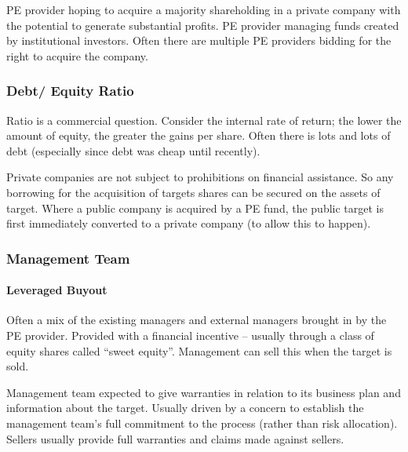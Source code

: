 \documentclass[
]{article}
\newenvironment{Shaded}{}{}
\newcommand{\NormalTok}[1]{#1}
\begin{document}
PE provider hoping to acquire a majority shareholding in a private
company with the potential to generate substantial profits. PE provider
managing funds created by institutional investors. Often there are
multiple PE providers bidding for the right to acquire the company.

\hypertarget{debt-equity-ratio}{%
\subsubsection{Debt/ Equity Ratio}\label{debt-equity-ratio}}

Ratio is a commercial question. Consider the internal rate of return;
the lower the amount of equity, the greater the gains per share. Often
there is lots and lots of debt (especially since debt was cheap until
recently).

\begin{Shaded}
\begin{Highlighting}[]
\NormalTok{Private companies are not subject to prohibitions on financial assistance. So any borrowing for the acquisition of target\textquotesingle{}s shares can be secured on the assets of target. Where a public company is acquired by a PE fund, the public target is first immediately converted to a private company (to allow this to happen). }
\end{Highlighting}
\end{Shaded}

\hypertarget{management-team}{%
\subsubsection{Management Team}\label{management-team}}

\hypertarget{leveraged-buyout}{%
\paragraph{Leveraged Buyout}\label{leveraged-buyout}}

Often a mix of the existing managers and external managers brought in by
the PE provider. Provided with a financial incentive -- usually through
a class of equity shares called ``sweet equity''. Management can sell
this when the target is sold.

Management team expected to give warranties in relation to its business
plan and information about the target. Usually driven by a concern to
establish the management team's full commitment to the process (rather
than risk allocation). Sellers usually provide full warranties and
claims made against sellers.
\end{document}
